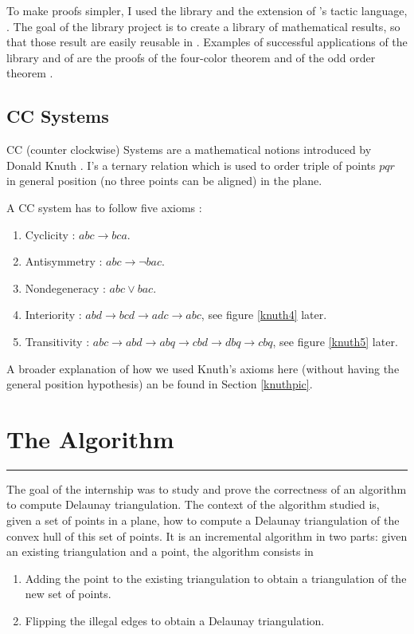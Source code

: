 \documentclass[a4paper,10pt]{article}
\begin{document}
To make proofs simpler, I used the {} library and the extension of {}'s tactic language, {}. The goal of the {} library project is to create a library of mathematical results, so that those result are easily reusable in {}. Examples of successful applications of the {} library and of {} are the proofs of the four-color theorem \cite{Gonthier08} and of the odd order theorem \cite{odd}.

\subsection{CC Systems}
\label{CC}
CC (counter clockwise) Systems are a mathematical notions introduced by Donald Knuth \cite{Knuth92}. I's a ternary relation which is used to order triple of points $pqr$ in general position (no three points can be aligned) in the plane.

A CC system has to follow five axioms :
\begin{enumerate}
\item Cyclicity : $abc \rightarrow bca$.
\item Antisymmetry : $abc\rightarrow \neg bac$.
\item Nondegeneracy : $abc \vee bac$.
\item Interiority : $abd \rightarrow bcd \rightarrow adc \rightarrow abc$, see figure \ref{knuth4} later.
\item Transitivity : $ abc \rightarrow abd \rightarrow abq \rightarrow cbd \rightarrow dbq \rightarrow cbq $, see figure \ref{knuth5} later.
\end{enumerate}

A broader explanation of how we used Knuth's axioms here (without having the general position hypothesis) an be found in Section \ref{knuthpic}.


\section{The Algorithm}
\label{algo}
\rule{\linewidth}{0.5pt}

The goal of the internship was to study and prove the correctness of an algorithm to compute Delaunay triangulation. The context of the algorithm studied is, given a set of points in a plane, how to compute a Delaunay triangulation of the convex hull of this set of points. It is an incremental algorithm in two parts: given an existing triangulation and a point, the algorithm consists in
\begin{enumerate}
\item Adding the point to the existing triangulation to obtain a triangulation of the new set of points.
\item Flipping the illegal edges to obtain a Delaunay triangulation.
\end{enumerate}
\end{document}
